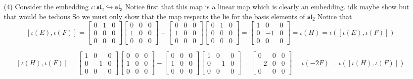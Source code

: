 \documentclass[12pt]{amsart}
\begin{document}
\begin{itemize}
    \item[(4)] %
    Consider the embedding $\iota:\mathfrak{sl}_2\hookrightarrow\mathfrak{sl}_3$
    Notice first that this map is a linear map which is clearly an embedding. idk maybe show but that would be tedious
    So we must only show that the map respects the lie for the basis elements of $\mathfrak{sl}_2$
    Notice that 
    \[[\iota(E),\iota(F)]=\begin{bmatrix}
        0&1&0\\0&0&0\\0&0&0
    \end{bmatrix}\begin{bmatrix}
        0&0&0\\1&0&0\\0&0&0
    \end{bmatrix}-\begin{bmatrix}
        0&0&0\\1&0&0\\0&0&0
    \end{bmatrix}\begin{bmatrix}
        0&1&0\\0&0&0\\0&0&0
    \end{bmatrix} =\begin{bmatrix}
        1&0&0\\0&-1&0\\0&0&0
    \end{bmatrix} =\iota(H) = \iota([\iota(E),\iota(F)])\]

    \[[\iota(H),\iota(F)]=\begin{bmatrix}
        1&0&0\\0&-1&0\\0&0&0
    \end{bmatrix}\begin{bmatrix}
        0&0&0\\1&0&0\\0&0&0
    \end{bmatrix}-\begin{bmatrix}
        0&0&0\\1&0&0\\0&0&0
    \end{bmatrix}\begin{bmatrix}
        1&0&0\\0&-1&0\\0&0&0
    \end{bmatrix}=\begin{bmatrix}
        0&0&0\\-2&0&0\\0&0&0
    \end{bmatrix} =\iota(-2F) = \iota([\iota(H),\iota(F)])\]


\end{itemize}
\end{document}
